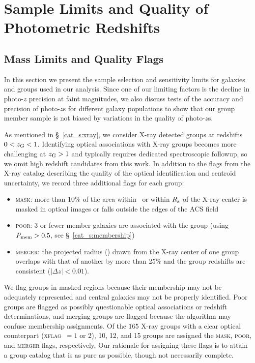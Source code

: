 \section{Sample Limits and Quality of Photometric Redshifts}
\label{cat_s:sample}

\subsection{Mass Limits and Quality Flags}

In this section we present the sample selection and sensitivity limits
for galaxies and groups used in our analysis. Since one of our
limiting factors is the decline in photo-$z$ precision at faint magnitudes,
we also discuss tests of the accuracy and precision of
photo-$z$s for different galaxy populations to show that our group member
sample is not biased by variations in the quality of photo-$z$s.

As mentioned in \S~\ref{cat_s:xray}, we consider X-ray detected groups at
redshifts $0<\mbox{$z_{\rm G}$}<1$. Identifying optical associations with X-ray
groups becomes more challenging at $\mbox{$z_{\rm G}$}>1$ and typically requires
dedicated spectroscopic followup, so we omit high redshift candidates
from this work. In addition to the flags from the X-ray catalog
describing the quality of the optical identification and centroid
uncertainty, we record three additional flags for each group:
\begin{itemize}
\item{\textsc{mask}: more than $10\%$ of the area within \rvir\ or within
    $R_{\rm{s}}$ of the X-ray center is masked in optical images or
    falls outside the edges of the ACS field}
\item{\textsc{poor}: 3 or fewer member galaxies are associated with the group
    (using $P_{\rm mem}>0.5$, see \S~\ref{cat_s:membership})}
\item{\textsc{merger}: the projected radius (\rvir) drawn from the X-ray center of one
    group overlaps with that of another by more than $25\%$ and the
    group redshifts are consistent ($|\Delta z|<0.01$).}
\end{itemize}
We flag groups in masked regions because their membership may not be
adequately represented and central galaxies may not be
properly identified. Poor groups are flagged as possibly questionable
optical associations or redshift determinations, and merging groups
are flagged because the algorithm may confuse membership
assignments. Of the $165$ X-ray groups with a clear optical
counterpart (\textsc{xflag}~$=1$ or 2), 10, 12, and 15 groups are
assigned the \textsc{mask}, \textsc{poor}, and \textsc{merger} flags,
respectively. Our rationale for assigning these flags is to attain a
group catalog that is as pure as possible, though not necessarily complete.

